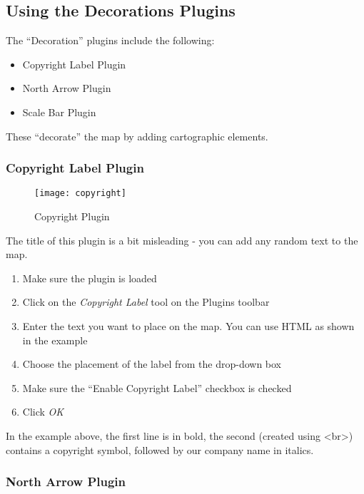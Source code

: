 \subsection{Using the Decorations Plugins}

The ``Decoration'' plugins include the following:

\begin{itemize}
\item Copyright Label Plugin
\item North Arrow Plugin
\item Scale Bar Plugin
\end{itemize}
 
These ``decorate'' the map by adding cartographic elements. 

\subsubsection{Copyright Label Plugin}

\begin{figure}[ht]
   \begin{center}
   \caption{Copyright Plugin}\label{fig:copyright}\smallskip
   \texttt{[image: copyright]}
\end{center}  
\end{figure}

The title of this plugin is a bit misleading - you can add any random text to the map.

\begin{enumerate}
\item Make sure the plugin is loaded
\item Click on the \textsl{Copyright Label} tool on the Plugins toolbar
\item Enter the text you want to place on the map. You can use HTML as
  shown in the example
\item Choose the placement of the label from the drop-down box
\item Make sure the ``Enable Copyright Label'' checkbox is checked
\item Click \textsl{OK} 
\end{enumerate}

In the example above, the first line is in bold, the second (created using
\textless br\textgreater) contains a copyright symbol, followed by our company name in
italics.

\subsubsection{North Arrow Plugin}

